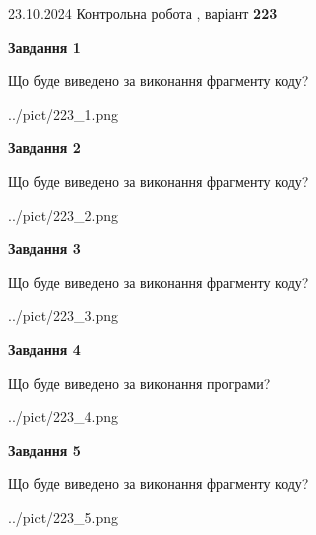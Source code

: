 \documentclass[12pt, ukrainian]{article}
\begin{document}
{\Large{23.10.2024 Контрольна робота , варіант  \No \textbf { 223 }\par}}
{
\begin {large}
{\begin {center}\textbf{Завдання 1}\end {center}}

Що буде виведено за виконання фрагменту коду?\par
\begin{center}
	{../pict/223_1.png}
\end{center}
\newpage

{\begin {center}\textbf{Завдання 2}\end {center}}

Що буде виведено за виконання фрагменту коду?\par
\begin{center}
	{../pict/223_2.png}
\end{center}
\newpage

{\begin {center}\textbf{Завдання 3}\end {center}}

Що буде виведено за виконання фрагменту коду?\par
\begin{center}
	{../pict/223_3.png}
\end{center}
\newpage

{\begin {center}\textbf{Завдання 4}\end {center}}

Що буде виведено за виконання програми?\par
\begin{center}
	{../pict/223_4.png}
\end{center}
\newpage

{\begin {center}\textbf{Завдання 5}\end {center}}

Що буде виведено за виконання фрагменту коду?\par
\begin{center}
	{../pict/223_5.png}
\end{center}
\newpage


\end{large}}
\end{document}
